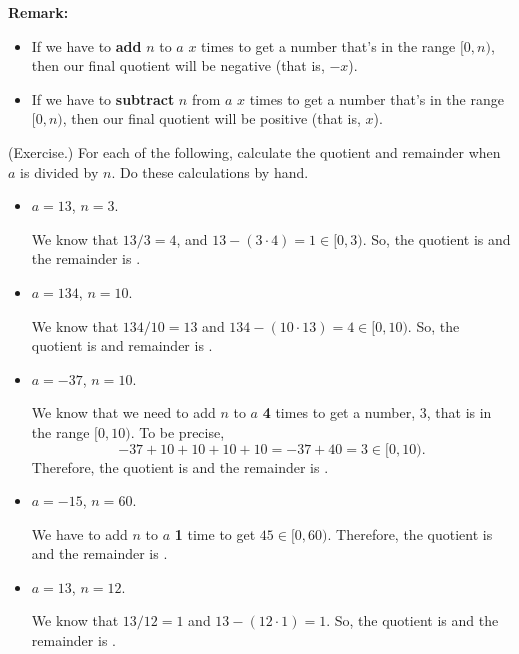 \documentclass[letterpaper]{article}
\newcommand{\0}{\mathbf{0}}
\begin{document}
\textbf{Remark:} 
\begin{itemize}
    \item If we have to \textbf{add} $n$ to $a$ $x$ times to get a number that's in the range $[0, n)$, then our final quotient will be negative (that is, $-x$).
    \item If we have to \textbf{subtract} $n$ from $a$ $x$ times to get a number that's in the range $[0, n)$, then our final quotient will be positive (that is, $x$).
\end{itemize}

\begin{mdframed}
    (Exercise.) For each of the following, calculate the quotient and remainder when $a$ is divided by $n$. Do these calculations by hand. 
    \begin{itemize}
        \item $a = 13$, $n = 3$.
        \begin{mdframed}
            We know that $13 / 3 = 4$, and $13 - (3 \cdot 4) = 1 \in [0, 3)$. So, the quotient is  and the remainder is . 
        \end{mdframed}
        \item $a = 134$, $n = 10$.
        \begin{mdframed}
            We know that $134 / 10 = 13$ and $134 - (10 \cdot 13) = 4 \in [0, 10)$. So, the quotient is  and remainder is .
        \end{mdframed}
        \item $a = -37$, $n = 10$.
        \begin{mdframed}
            We know that we need to add $n$ to $a$ \textbf{4} times to get a number, $3$, that is in the range $[0, 10)$. To be precise, 
            \[-37 + 10 + 10 + 10 + 10 = -37 + 40 = 3 \in [0, 10).\]
            Therefore, the quotient is  and the remainder is . 
        \end{mdframed}
        \item $a = -15$, $n = 60$.
        \begin{mdframed}
            We have to add $n$ to $a$ \textbf{1} time to get $45 \in [0, 60)$. Therefore, the quotient is  and the remainder is .
        \end{mdframed}
        \item $a = 13$, $n = 12$.
        \begin{mdframed}
            We know that $13 / 12 = 1$ and $13 - (12 \cdot 1) = 1$. So, the quotient is  and the remainder is .
        \end{mdframed}
    \end{itemize}
\end{mdframed}
\end{document}
